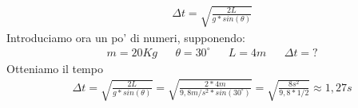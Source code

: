                 \begin{align*}
                    &\Delta t = \sqrt{\frac{2L}{g*sin(\theta)}}
                \end{align*}
                Introduciamo ora un po' di numeri, supponendo:
                \label{EsercizioConAttrito}
                \begin{align*}
                    &m = 20Kg && \theta = 30^\circ && L = 4 m && \Delta t = ?
                \end{align*}
                Otteniamo il tempo
                \begin{align*}
                    &\Delta t = \sqrt{\frac{2L}{g*sin(\theta)}} = \sqrt{\frac{2*4m}{9,8m/s^2*sin(30^\circ)}}=\sqrt{\frac{8 s^2}{9,8*1/2}} \approx 1,27 s
                \end{align*}

